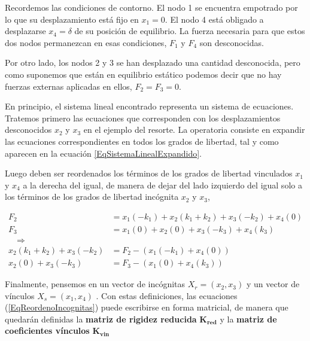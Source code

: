 
Recordemos las condiciones de contorno. El nodo 1 se encuentra empotrado por lo
que su desplazamiento está fijo en $x_1=0$. El nodo 4 está obligado a
desplazarse $x_4 = \delta$ de su posición de equilibrio.  La fuerza necesaria
para que estos dos nodos permanezcan en esas condiciones, $F_1$ y $F_4$ son
desconocidas. 

Por otro lado, los nodos 2 y 3 se han desplazado una cantidad desconocida, pero
como suponemos que están en equilibrio estático podemos decir que no hay
fuerzas externas aplicadas en ellos, $F_2 = F_3 = 0$.

En principio, el sistema lineal encontrado representa un sistema de ecuaciones.
Tratemos primero las ecuaciones que corresponden con los desplazamientos
desconocidos $x_2$ y $x_3$ en el ejemplo del resorte. La operatoria consiste en
expandir las ecuaciones correspondientes en todos los grados de libertad, tal y
como aparecen en la ecuación \ref{EqSistemaLinealExpandido}.

Luego deben ser reordenados los términos de los grados de libertad vinculados
$x_1$ y $x_4$ a la derecha del igual, de manera de dejar del lado izquierdo del
igual solo a los términos de los grados de libertad incógnita $x_2$ y $x_3$, 

\begin{equation}
  \label{EqReordenoIncognitas}
    \begin{aligned}
        F_2 &= x_1 (-k_1) + x_2(k_1+k_2)+ x_3(-k_2) + x_4(0)\\
       F_3 &= x_1 (0) + x_2(0)+ x_3(-k_3) + x_4(k_3) \\
      \quad \Rightarrow \quad & \\
	 x_2(k_1+k_2)+ x_3(-k_2) &= F_2  - (x_1 (-k_1) +  x_4(0)   )\\
         x_2(0)      + x_3(-k_3) &= F_3  - (x_1 (0)    +  x_4(k_3) )
    \end{aligned}
\end{equation}

Finalmente, pensemos en un vector de incógnitas $X_r = (x_2, x_3)$   y un
vector de vínculos $X_s  = (x_1, x_4)$ . Con estas definiciones, las
ecuaciones (\ref{EqReordenoIncognitas})  puede escribirse en forma matricial, de manera que
  quedarán definidas la \textbf{matriz de rigidez reducida} $\mathbf{K_{red} }$ 
  y la \textbf{matriz de coeficientes vínculos} $\mathbf{K_{vin}}$

